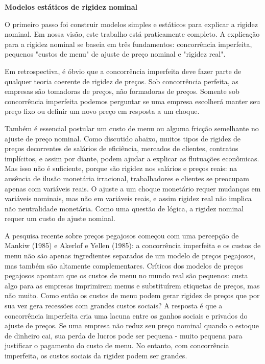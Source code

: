 \documentclass[a4paper,12pt]{article}[abntex2]
\begin{document}
\textbf{Modelos estáticos de rigidez nominal}

O primeiro passo foi construir modelos simples e estáticos para explicar a rigidez nominal. Em nossa visão, este trabalho está praticamente completo. A explicação para a rigidez nominal se baseia em três fundamentos: concorrência imperfeita, pequenos "custos de menu" de ajuste de preço nominal e "rigidez real".

Em retrospectiva, é óbvio que a concorrência imperfeita deve fazer parte de qualquer teoria coerente de rigidez de preços. Sob concorrência perfeita, as empresas são tomadoras de preços, não formadoras de preços. Somente sob concorrência imperfeita podemos perguntar se uma empresa escolherá manter seu preço fixo ou definir um novo preço em resposta a um choque.

Também é essencial postular um custo de menu ou alguma fricção semelhante no ajuste de preço nominal. Como discutido abaixo, muitos tipos de rigidez de preços decorrentes de salários de eficiência, mercados de clientes, contratos implícitos, e assim por diante, podem ajudar a explicar as flutuações econômicas. Mas isso não é suficiente, porque são rigidez nos salários e preços reais: na ausência de ilusão monetária irracional, trabalhadores e clientes se preocupam apenas com variáveis reais. O ajuste a um choque monetário requer mudanças em variáveis nominais, mas não em variáveis reais, e assim rigidez real não implica não neutralidade monetária. Como uma questão de lógica, a rigidez nominal requer um custo de ajuste nominal.

A pesquisa recente sobre preços pegajosos começou com uma percepção de Mankiw (1985) e Akerlof e Yellen (1985): a concorrência imperfeita e os custos de menu não são apenas ingredientes separados de um modelo de preços pegajosos, mas também são altamente complementares. Críticos dos modelos de preços pegajosos apontam que os custos de menu no mundo real são pequenos: custa algo para as empresas imprimirem menus e substituírem etiquetas de preços, mas não muito. Como então os custos de menu podem gerar rigidez de preços que por sua vez gera recessões com grandes custos sociais? A resposta é que a concorrência imperfeita cria uma lacuna entre os ganhos sociais e privados do ajuste de preços. Se uma empresa não reduz seu preço nominal quando o estoque de dinheiro cai, sua perda de lucros pode ser pequena - muito pequena para justificar o pagamento do custo de menu. No entanto, com concorrência imperfeita, os custos sociais da rigidez podem ser grandes.
\end{document}
